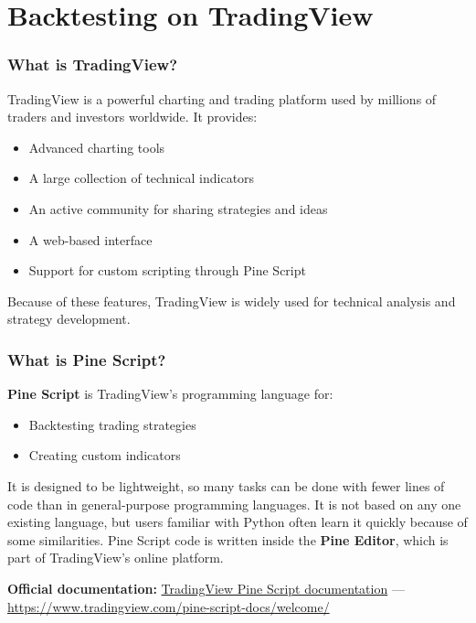 \documentclass[12pt,openany]{book}
\begin{document}
\section{Backtesting on TradingView}

\subsubsection{What is TradingView?}

TradingView is a powerful charting and trading platform used by millions of traders and investors worldwide. It provides:

\begin{itemize}[leftmargin=*]
    \item Advanced charting tools
    \item A large collection of technical indicators
    \item An active community for sharing strategies and ideas
    \item A web-based interface
    \item Support for custom scripting through Pine Script
\end{itemize}

Because of these features, TradingView is widely used for technical analysis and strategy development.

\subsubsection{What is Pine Script?}

\textbf{Pine Script} is TradingView's programming language for:

\begin{itemize}[leftmargin=*]
    \item Backtesting trading strategies
    \item Creating custom indicators
\end{itemize}

It is designed to be lightweight, so many tasks can be done with fewer lines of code than in general-purpose programming languages. It is not based on any one existing language, but users familiar with Python often learn it quickly because of some similarities. Pine Script code is written inside the \textbf{Pine Editor}, which is part of TradingView's online platform.

\textbf{Official documentation:} \href{https://www.tradingview.com/pine-script-docs/welcome/}{TradingView Pine Script documentation} --- \url{https://www.tradingview.com/pine-script-docs/welcome/}
\end{document}

